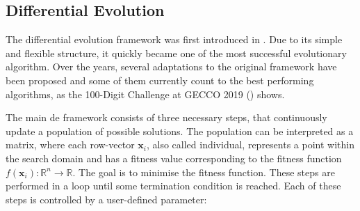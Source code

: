 \documentclass[./\jobname.tex]{subfiles}
\begin{document}
\subsection{Differential Evolution}

The differential evolution framework was first introduced in \cite{storn_differential_1997}. Due to its simple and flexible structure, it quickly became one of the most successful evolutionary algorithm. Over the years, several adaptations to the original framework have been proposed and some of them currently count to the best performing algorithms, as the 100-Digit Challenge at GECCO 2019 (\cite{suganthan_suganthancec2019_2020}) shows. 

The main \gls{de} framework consists of three necessary steps, that continuously update a population of possible solutions. The population can be interpreted as a matrix, where each row-vector $\mathbf{x}_i$, also called individual, represents a point within the search domain and has a fitness value corresponding to the fitness function $f(\mathbf{x}_i): \mathbb{R}^n \rightarrow \mathbb{R}$. The goal is to minimise the fitness function. These steps are performed in a loop until some termination condition is reached. Each of these steps is controlled by a user-defined parameter: 
\end{document}
